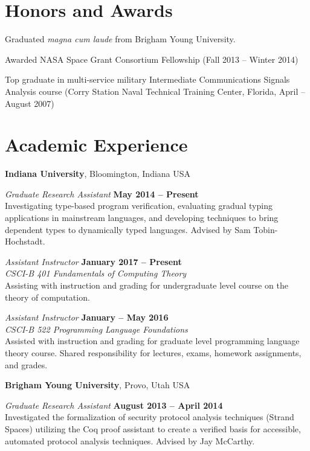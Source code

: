 \documentclass[margin,line]{res}
\begin{document}
\begin{resume}
\section{\sc Honors and Awards} 
Graduated \emph{magna cum laude} from Brigham Young University.

Awarded NASA Space Grant Consortium Fellowship (Fall 2013 -- Winter
2014)

Top graduate in multi-service military Intermediate Communications
Signals Analysis course (Corry Station Naval Technical Training
Center, Florida, April -- August 2007)

%

\section{\sc Academic Experience}
{\bf Indiana University}, Bloomington, Indiana USA

\vspace{-.3cm}
{\em Graduate Research Assistant} \hfill {\bf May 2014 -- Present}\\
Investigating type-based program verification, evaluating gradual
typing applications in mainstream languages, and developing techniques
to bring dependent types to dynamically typed languages. Advised by
Sam Tobin-Hochstadt.

{\em Assistant Instructor} \hfill {\bf January 2017 -- Present}\\ {\em
  CSCI-B 401 Fundamentals of Computing Theory}\\ Assisting with
instruction and grading for undergraduate level course on the theory
of computation.


{\em Assistant Instructor} \hfill {\bf January -- May 2016}\\ {\em
  CSCI-B 522 Programming Language Foundations}\\ Assisted with
instruction and grading for graduate level programming language theory
course.  Shared responsibility for lectures, exams, homework
assignments, and grades.

{\bf Brigham Young University}, Provo, Utah USA

\vspace{-.3cm}

{\em Graduate Research Assistant} \hfill {\bf August 2013 -- April
  2014}\\ Investigated the formalization of security protocol analysis
techniques (Strand Spaces) utilizing the Coq proof assistant to create
a verified basis for accessible, automated protocol analysis
techniques. Advised by Jay McCarthy.


\end{resume}
\end{document}
